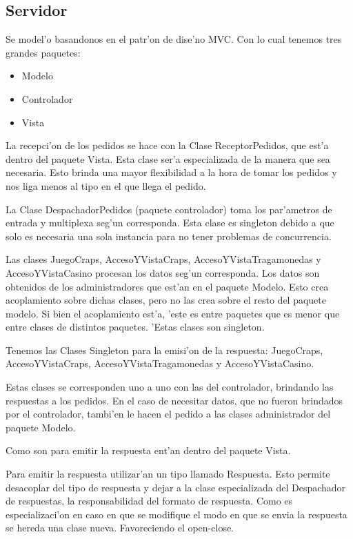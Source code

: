 \subsection{Servidor}
Se model'o basandonos en el patr'on de dise'no MVC. Con lo cual tenemos tres grandes paquetes:

\begin{itemize}
 \item Modelo
 \item Controlador
 \item Vista
\end{itemize}
 
La recepci'on de los pedidos se hace con la Clase ReceptorPedidos, que est'a dentro del paquete Vista. Esta clase ser'a especializada de la manera que sea necesaria. Esto brinda una mayor flexibilidad a la hora de tomar los pedidos y nos liga menos al tipo en el que llega el pedido.

La Clase DespachadorPedidos (paquete controlador) toma los par'ametros de entrada y multiplexa seg'un corresponda. Esta clase es singleton debido a que solo es necesaria una sola instancia para no tener problemas de concurrencia.

Las clases JuegoCraps, AccesoYVistaCraps, AccesoYVistaTragamonedas y AccesoYVistaCasino procesan los datos seg'un corresponda. Los datos son obtenidos de los administradores que est'an en el paquete Modelo. Esto crea acoplamiento sobre dichas clases, pero no las crea sobre el resto del paquete modelo. Si bien el acoplamiento est'a, 'este es entre paquetes que es menor que entre clases de distintos paquetes. 'Estas clases son singleton.

Tenemos las Clases Singleton para la emisi'on de la respuesta: JuegoCraps, AccesoYVistaCraps, AccesoYVistaTragamonedas y AccesoYVistaCasino.

Estas clases se corresponden uno a uno con las del controlador, brindando las respuestas a los pedidos. En el caso de necesitar datos, que no fueron brindados por el controlador, tambi'en le hacen el pedido a las clases administrador del paquete Modelo.

Como son para emitir la respuesta ent'an dentro del paquete Vista.

Para emitir la respuesta utilizar'an un tipo llamado Respuesta. Esto permite desacoplar del tipo de respuesta y dejar a la clase especializada del Despachador de respuestas, la responsabilidad del formato de respuesta. Como es especializaci'on en caso en que se modifique el modo en que se envia la respuesta se hereda una clase nueva. Favoreciendo el open-close.

